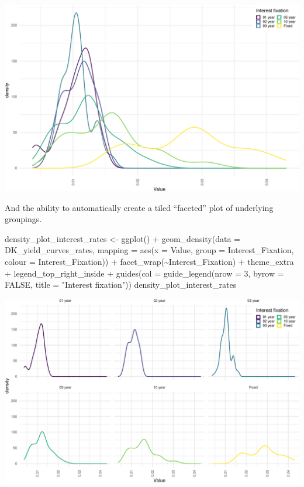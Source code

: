\documentclass[
]{book}
\newenvironment{Shaded}{\begin{snugshade}}{\end{snugshade}}
\newcommand{\AttributeTok}[1]{\textcolor[rgb]{0.77,0.63,0.00}{#1}}
\newcommand{\ConstantTok}[1]{\textcolor[rgb]{0.00,0.00,0.00}{#1}}
\newcommand{\DecValTok}[1]{\textcolor[rgb]{0.00,0.00,0.81}{#1}}
\newcommand{\FunctionTok}[1]{\textcolor[rgb]{0.00,0.00,0.00}{#1}}
\newcommand{\NormalTok}[1]{#1}
\newcommand{\OtherTok}[1]{\textcolor[rgb]{0.56,0.35,0.01}{#1}}
\newcommand{\SpecialCharTok}[1]{\textcolor[rgb]{0.00,0.00,0.00}{#1}}
\newcommand{\StringTok}[1]{\textcolor[rgb]{0.31,0.60,0.02}{#1}}
\begin{document}
\includegraphics{figures/unnamed-chunk-3-1.pdf}

And the ability to automatically create a tiled ``faceted'' plot of underlying groupings.

\begin{Shaded}
\begin{Highlighting}[]
\NormalTok{density\_plot\_interest\_rates }\OtherTok{\textless{}{-}} \FunctionTok{ggplot}\NormalTok{() }\SpecialCharTok{+} 
        \FunctionTok{geom\_density}\NormalTok{(}\AttributeTok{data =}\NormalTok{ DK\_yield\_curves\_rates,}
                     \AttributeTok{mapping =} \FunctionTok{aes}\NormalTok{(}\AttributeTok{x =}\NormalTok{ Value,}
                            \AttributeTok{group =}\NormalTok{ Interest\_Fixation,}
                            \AttributeTok{colour =}\NormalTok{ Interest\_Fixation)) }\SpecialCharTok{+}
    \FunctionTok{facet\_wrap}\NormalTok{(}\SpecialCharTok{\textasciitilde{}}\NormalTok{Interest\_Fixation) }\SpecialCharTok{+}
\NormalTok{    theme\_extra }\SpecialCharTok{+}
\NormalTok{    legend\_top\_right\_inside }\SpecialCharTok{+}
    \FunctionTok{guides}\NormalTok{(}\AttributeTok{col =} \FunctionTok{guide\_legend}\NormalTok{(}\AttributeTok{nrow =} \DecValTok{3}\NormalTok{, }
                              \AttributeTok{byrow =} \ConstantTok{FALSE}\NormalTok{,}
                              \AttributeTok{title =} \StringTok{"Interest fixation"}\NormalTok{))}
\NormalTok{density\_plot\_interest\_rates}
\end{Highlighting}
\end{Shaded}

\includegraphics{figures/unnamed-chunk-4-1.pdf}
\end{document}
